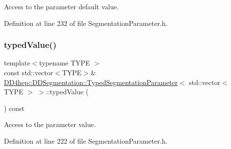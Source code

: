 Access to the parameter default value. 



Definition at line 232 of file Segmentation\+Parameter.\+h.

\hypertarget{class_d_d4hep_1_1_d_d_segmentation_1_1_typed_segmentation_parameter_3_01std_1_1vector_3_01_t_y_p_e_01_4_01_4_ad28706ead2996fc42cee6a75325511ca}{}\label{class_d_d4hep_1_1_d_d_segmentation_1_1_typed_segmentation_parameter_3_01std_1_1vector_3_01_t_y_p_e_01_4_01_4_ad28706ead2996fc42cee6a75325511ca} 
\subsubsection{\texorpdfstring{typed\+Value()}{typedValue()}}
{\footnotesize\ttfamily template$<$typename T\+Y\+PE $>$ \\
const std\+::vector$<$T\+Y\+PE$>$\& \hyperlink{class_d_d4hep_1_1_d_d_segmentation_1_1_typed_segmentation_parameter}{D\+D4hep\+::\+D\+D\+Segmentation\+::\+Typed\+Segmentation\+Parameter}$<$ std\+::vector$<$ T\+Y\+PE $>$ $>$\+::typed\+Value (\begin{DoxyParamCaption}{ }\end{DoxyParamCaption}) const\hspace{0.3cm}{\ttfamily [inline]}}



Access to the parameter value. 



Definition at line 222 of file Segmentation\+Parameter.\+h.

\hypertarget{class_d_d4hep_1_1_d_d_segmentation_1_1_typed_segmentation_parameter_3_01std_1_1vector_3_01_t_y_p_e_01_4_01_4_a347b2aa67cdbf97444bb0d41d4ab29e9}{}\label{class_d_d4hep_1_1_d_d_segmentation_1_1_typed_segmentation_parameter_3_01std_1_1vector_3_01_t_y_p_e_01_4_01_4_a347b2aa67cdbf97444bb0d41d4ab29e9} 
